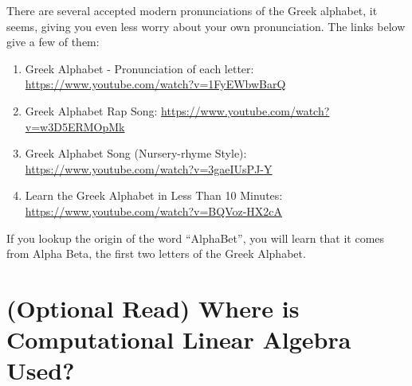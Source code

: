 There are several accepted modern pronunciations of the Greek alphabet, it seems, giving you even less worry about your own pronunciation. The links below give a few of them:  
\begin{enumerate}
 \item Greek Alphabet - Pronunciation of each letter: \url{https://www.youtube.com/watch?v=1FyEWbwBarQ}
 
    \item Greek Alphabet Rap Song: \url{https://www.youtube.com/watch?v=w3D5ERMOpMk} 

 \item Greek Alphabet Song (Nursery-rhyme Style):  \url{https://www.youtube.com/watch?v=3gaeIUsPJ-Y}
 
 
 \item Learn the Greek Alphabet in Less Than 10 Minutes:  \url{https://www.youtube.com/watch?v=BQVoz-HX2cA}

 \end{enumerate}
 If you lookup the origin of the word ``AlphaBet'', you will learn that it comes from Alpha Beta, the first two letters of the Greek Alphabet. 


\section{(Optional Read) Where is Computational Linear Algebra Used? }


